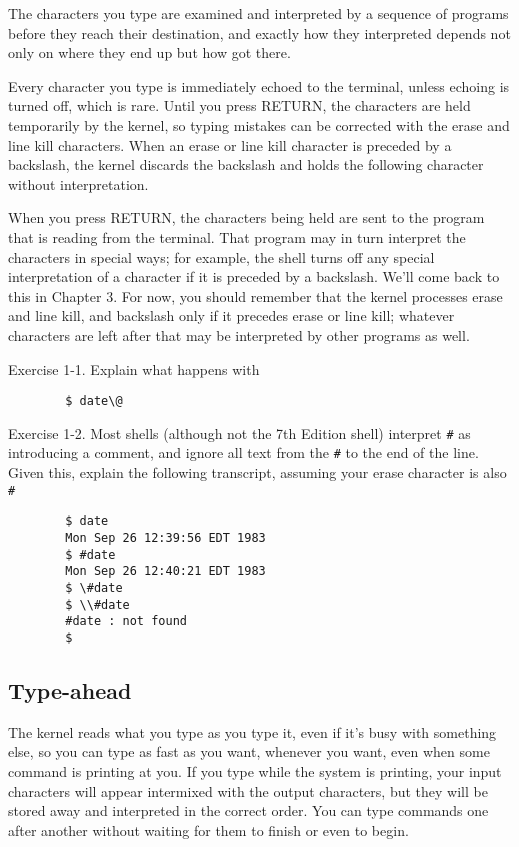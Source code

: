 The characters you type are examined and interpreted by a sequence of programs
before they reach their destination, and exactly how they interpreted depends
not only on where they end up but how got there.

Every character you type is immediately echoed to the terminal, unless echoing
is turned off, which is rare. Until you press RETURN, the characters are held
temporarily by the kernel, so typing mistakes can be corrected with the erase
and line kill characters. When an erase or line kill character is preceded by a
backslash, the kernel discards the backslash and holds the following character
without interpretation.

When you press RETURN, the characters being held are sent to the program that is
reading from the terminal. That program may in turn interpret the characters in
special ways; for example, the shell turns off any special interpretation of a
character if it is preceded by a backslash. We'll come back to this in Chapter
3. For now, you should remember that the kernel processes erase and line kill,
and backslash only if it precedes erase or line kill; whatever characters are
left after that may be interpreted by other programs as well.

Exercise 1-1. Explain what happens with
\begin{verbatim}
        $ date\@
\end{verbatim}

Exercise 1-2. Most shells (although not the 7th Edition shell) interpret
\verb=#= as introducing a comment, and ignore all text from the \verb=#= to the
end of the line. Given this, explain the following transcript, assuming your
erase character is also \verb=#=
\begin{verbatim}
        $ date
        Mon Sep 26 12:39:56 EDT 1983
        $ #date
        Mon Sep 26 12:40:21 EDT 1983
        $ \#date
        $ \\#date
        #date : not found
        $
\end{verbatim}


\subsection{Type-ahead}
The kernel reads what you type as you type it, even if it's busy with something
else, so you can type as fast as you want, whenever you want, even when some
command is printing at you. If you type while the system is printing, your input
characters will appear intermixed with the output characters, but they will be
stored away and interpreted in the correct order. You can type commands one
after another without waiting for them to finish or even to begin.


